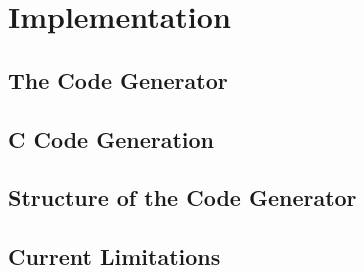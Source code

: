 \chapter{Implementation}

\section{The Code Generator}



\section{C Code Generation}



\section{Structure of the Code Generator}



\section{Current Limitations}


